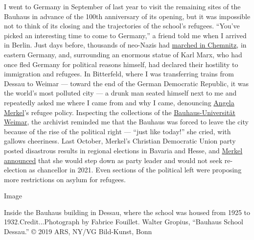 I went to Germany in September of last year to visit the remaining sites
of the Bauhaus in advance of the 100th anniversary of its opening, but
it was impossible not to think of its closing and the trajectories of
the school's refugees. ``You've picked an interesting time to come to
Germany,'' a friend told me when I arrived in Berlin. Just days before,
thousands of neo-Nazis had
\href{https://www.nytimes3xbfgragh.onion/2018/08/30/world/europe/germany-neo-nazi-protests-chemnitz.html}{marched
in Chemnitz}, in eastern Germany, and, surrounding an enormous statue of
Karl Marx, who had once fled Germany for political reasons himself, had
declared their hostility to immigration and refugees. In Bitterfeld,
where I was transferring trains from Dessau to Weimar --- toward the end
of the German Democratic Republic, it was the world's most polluted city
--- a drunk man seated himself next to me and repeatedly asked me where
I came from and why I came, denouncing
\href{https://www.nytimes3xbfgragh.onion/2018/12/07/world/europe/angela-merkel-germany.html}{Angela
Merkel}'s refugee policy. Inspecting the collections of the
\href{https://www.uni-weimar.de/en/university/start/}{Bauhaus-Universität
Weimar}, the archivist reminded me that the Bauhaus was forced to leave
the city because of the rise of the political right --- ``just like
today!'' she cried, with gallows cheeriness. Last October, Merkel's
Christian Democratic Union party posted disastrous results in regional
elections in Bavaria and Hesse, and
\href{https://www.nytimes3xbfgragh.onion/2018/10/29/world/europe/angela-merkel-germany.html?module=inline}{Merkel
announced} that she would step down as party leader and would not seek
re-election as chancellor in 2021. Even sections of the political left
were proposing more restrictions on asylum for refugees.

Image

Inside the Bauhaus building in Dessau, where the school was housed from
1925 to 1932.Credit...Photograph by Fabrice Fouillet. Walter Gropius,
``Bauhaus School Dessau.'' © 2019 ARS, NY/VG Bild-Kunst, Bonn

